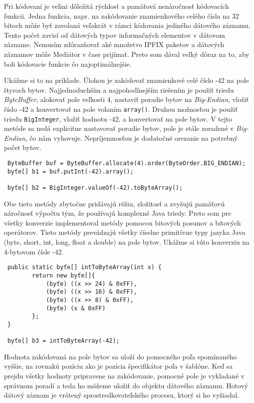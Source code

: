 Pri kódovaní je veľmi dôležitá rýchlosť a pamäťová 
nenáročnosť kódovacích funkcii. Jedna funkcia, napr. na zakódovanie znamienkového celého čísla na 32
bitoch môže byť zavolaná veľakrát v rámci kódovania jediného dátového záznamu. Tento počet zavisí od 
dátových typov informačných elementov v dátovom zázname. Nemusím zdôrazňovať aké množstvo IPFIX paketov 
a dátových záznamov môže Mediátor v čase prijímať. Preto som dával veľký dôraz na to, aby boli 
kódovacie funkcie čo najoptimálnejšie. 

Ukážme si to na príklade. Úlohou je zakódovať znamienkové celé číslo -42 na pole štyroch bytov.
Najjednoduchším a najpohodlnejším riešením je použiť triedu \emph{ByteBuffer}, alokovať pole veľkosti 
4, nastaviť poradie bytov na \emph{Big-Endian}, vložiť číslo -42 a konvertovať na pole 
volaním \verb|array()|. Druhou možnosťou je použiť triedu \verb|BigInteger|, vložiť hodnotu -42, 
a konvertovať na pole bytov. V tejto metóde sa nedá explicitne nastavovať poradie bytov, pole 
je stále zoradené v \emph{Big-Endian}, čo nám vyhovuje. Nepríjemnosťou je dodatočné orezanie na 
potrebný počet bytov. 
\begin{verbatim}
 ByteBuffer buf = ByteBuffer.allocate(4).order(ByteOrder.BIG_ENDIAN);
 byťe[] b1 = buf.putInt(-42).array();
 
 byťe[] b2 = BigInteger.valueOf(-42).toByteArray();
\end{verbatim}
Obe tieto metódy zbytočne pridávajú réžiu, zložitosť a zvyšujú pamäťovú náročnosť výpočtu tým, že 
používajú komplexné Java triedy. Preto som pre všetky konverzie implementoval metódy pomocou bitových
posunov a bitových operátorov. Tieto metódy prevádzajú všetky číselne primitívne typy jazyka Java 
(byte, short, int, long, float a double) na pole bytov. Ukážme si túto konverziu na 4-bytovom 
čísle -42.
\begin{verbatim}
 public static byťe[] intToByteArray(int x) {
        return new byťe[]{
            (byťe) ((x >> 24) & 0xFF),
            (byťe) ((x >> 16) & 0xFF),
            (byťe) ((x >> 8) & 0xFF),
            (byťe) (x & 0xFF)
        };
 }
 
 byťe[] b3 = intToByteArray(-42);
\end{verbatim}

Hodnota zakódovaná na pole bytov sa uloží do pomocného poľa spomínaného vyššie, na rovnakú pozíciu
ako je pozícia špecifikátor poľa v šablóne. Keď sa prejdu všetky hodnoty pripravene na zakódovanie, 
pomocné pole je vykladané v správnom poradí a teda ho môžeme uložiť do objektu dátového záznamu.
Hotový dátový záznam je vrátený sprostredkovateľského procesu, ktorý si ho vyžiadal.


